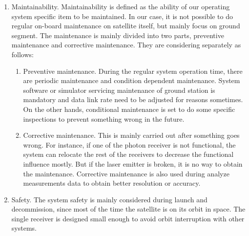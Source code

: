 \begin{enumerate}
	\item Maintainability. Maintainability is defined as the ability of our operating system specific item to be maintained. In our case, it is not possible to do regular on-board maintenance on satellite itself, but mainly focus on ground segment. The maintenance is mainly divided into two parts, preventive maintenance and corrective maintenance. They are considering separately as follows: 
	\begin{enumerate}
		\item Preventive maintenance. During the regular system operation time, there are periodic maintenance and condition dependent maintenance.  System software or simulator servicing maintenance of ground station is mandatory and data link rate need to be adjusted for reasons sometimes. On the other hands, conditional maintenance is set to do some specific inspections to prevent something wrong in the future.
		\item Corrective maintenance. This is mainly carried out after something goes wrong. For instance, if one of the photon receiver is not functional, the system can relocate the rest of the receivers to decrease the functional influence mostly. But if the laser emitter is broken, it is no way to obtain the maintenance. Corrective maintenance is also used during analyze measurements data to obtain better resolution or accuracy.
  	\end{enumerate}

	\item Safety. The system safety is mainly considered during launch and decommission, since most of the time the satellite is on its orbit in space. The single receiver is designed small enough to avoid orbit interruption with other systems. 
\end{enumerate}
